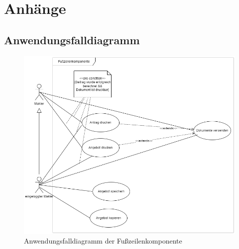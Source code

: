 \appendix
\clearpage
\section{Anhänge}
\subsection{Anwendungsfalldiagramm}
	\label{usecasefootersection}
\begin{figure}[!htb]
	\includegraphics[width=\textwidth, height=\textheight, keepaspectratio]{anhang/usecase_footer.png}
	\caption{Anwendungsfalldiagramm der Fußzeilenkomponente}
	\label{usecasefooter}
\end{figure}


